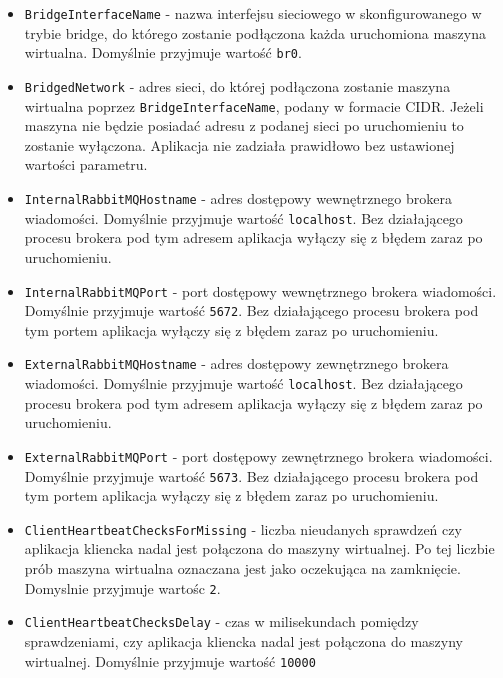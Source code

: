 \documentclass[../opis-rozwiazania.tex]{subfiles}
\begin{document}
\begin{itemize}
  \item \texttt{BridgeInterfaceName} - nazwa interfejsu sieciowego w skonfigurowanego w trybie bridge, do którego zostanie podłączona każda uruchomiona maszyna wirtualna. Domyślnie przyjmuje wartość \texttt{br0}.
  \item \texttt{BridgedNetwork} - adres sieci, do której podłączona zostanie maszyna wirtualna poprzez \texttt{BridgeInterfaceName}, podany w formacie CIDR. Jeżeli maszyna nie będzie posiadać adresu z podanej sieci po uruchomieniu to zostanie wyłączona. Aplikacja nie zadziała prawidłowo bez ustawionej wartości parametru.
  \item \texttt{InternalRabbitMQHostname} - adres dostępowy wewnętrznego brokera wiadomości. Domyślnie przyjmuje wartość \texttt{localhost}. Bez działającego procesu brokera pod tym adresem aplikacja wyłączy się z błędem zaraz po uruchomieniu.
  \item \texttt{InternalRabbitMQPort} - port dostępowy wewnętrznego brokera wiadomości. Domyślnie przyjmuje wartość \texttt{5672}. Bez działającego procesu brokera pod tym portem aplikacja wyłączy się z błędem zaraz po uruchomieniu.
  \item \texttt{ExternalRabbitMQHostname} - adres dostępowy zewnętrznego brokera wiadomości. Domyślnie przyjmuje wartość \texttt{localhost}. Bez działającego procesu brokera pod tym adresem aplikacja wyłączy się z błędem zaraz po uruchomieniu.
  \item \texttt{ExternalRabbitMQPort} -  port dostępowy zewnętrznego brokera wiadomości. Domyślnie przyjmuje wartość \texttt{5673}. Bez działającego procesu brokera pod tym portem aplikacja wyłączy się z błędem zaraz po uruchomieniu.
  \item \texttt{ClientHeartbeatChecksForMissing} - liczba nieudanych sprawdzeń czy aplikacja kliencka nadal jest połączona do maszyny wirtualnej. Po tej liczbie prób maszyna wirtualna oznaczana jest jako oczekująca na zamknięcie. Domyslnie przyjmuje wartośc \texttt{2}.
  \item \texttt{ClientHeartbeatChecksDelay} - czas w milisekundach pomiędzy sprawdzeniami, czy aplikacja kliencka nadal jest połączona do maszyny wirtualnej. Domyślnie przyjmuje wartość \texttt{10000}
\end{itemize}
\end{document}
